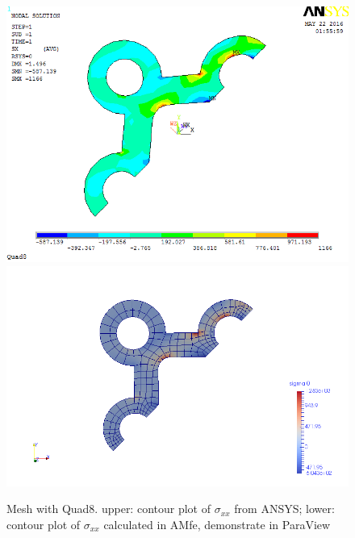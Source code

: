 \begin{figure}[htbp]
	\begin{center}
		\includegraphics[width=13cm,clip]{Quad8_Sxx.png} 		
		\includegraphics[width=13cm,clip]{Quad8_Sxx_P.png} 		
		\caption{Mesh with Quad8. upper: contour plot of $\sigma_{xx}$ from ANSYS; lower: contour plot of $\sigma_{xx}$ calculated in AMfe, demonstrate in ParaView} \label{fig: Quad8_Sxx}
	\end{center}
\end{figure}
\clearpage 

